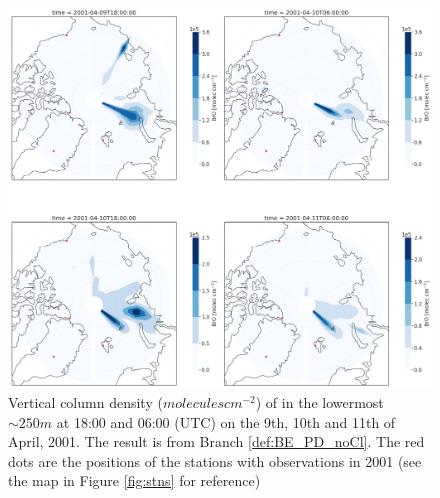 \begin{figure}[h]
    \centering
    \includegraphics[width = \linewidth]{Chapter6_Results/images/polarBrO_noCl.png}
    \caption{Vertical column density ($molecules cm^{-2}$) of  in the lowermost $\sim 250 m$ at 18:00 and 06:00 (UTC) on the 9th, 10th and 11th of April, 2001. The result is from Branch \ref{def:BE_PD_noCl}. The red dots are the positions of the stations with observations in 2001 (see the map in Figure \ref{fig:stns} for reference)}
    \label{fig:polarBrO_noCl}
\end{figure}